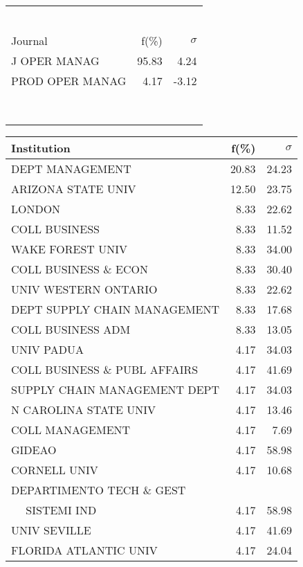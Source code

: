\documentclass[a4paper,11pt]{report}
\begin{document}
\begin{landscape}
\begin{table}[!ht]
{\begin{tabular}{|l r r|}
 &  & \\
 &  & \\
 &  & \\
 &  & \\
 &  & \\
 &  & \\
\hline
\hline
Journal & f(\%) & $\sigma$\\
\hline
J OPER MANAG & 95.83 & 4.24\\
PROD OPER MANAG & 4.17 & -3.12\\
 &  & \\
 &  & \\
 &  & \\
 &  & \\
 &  & \\
 &  & \\
 &  & \\
 &  & \\
\hline
\end{tabular}
}
{\scriptsize\begin{tabular}{|l r r|}
\hline
Institution & f(\%) & $\sigma$\\
\hline
DEPT MANAGEMENT & 20.83 & 24.23\\
ARIZONA STATE UNIV & 12.50 & 23.75\\
LONDON & 8.33 & 22.62\\
COLL BUSINESS & 8.33 & 11.52\\
WAKE FOREST UNIV & 8.33 & 34.00\\
COLL BUSINESS \& ECON & 8.33 & 30.40\\
UNIV WESTERN ONTARIO & 8.33 & 22.62\\
DEPT SUPPLY CHAIN MANAGEMENT & 8.33 & 17.68\\
COLL BUSINESS ADM & 8.33 & 13.05\\
UNIV PADUA & 4.17 & 34.03\\
COLL BUSINESS \& PUBL AFFAIRS & 4.17 & 41.69\\
SUPPLY CHAIN MANAGEMENT DEPT & 4.17 & 34.03\\
N CAROLINA STATE UNIV & 4.17 & 13.46\\
COLL MANAGEMENT & 4.17 & 7.69\\
GIDEAO & 4.17 & 58.98\\
CORNELL UNIV & 4.17 & 10.68\\
DEPARTIMENTO TECH \& GEST &  & \\
$\quad$ SISTEMI IND & 4.17 & 58.98\\
UNIV SEVILLE & 4.17 & 41.69\\
FLORIDA ATLANTIC UNIV & 4.17 & 24.04\\

\end{tabular}}
\end{table}
\end{landscape}
\end{document}
